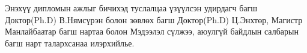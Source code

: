 
\begin{acknowledgements}
\addchaptertocentry{\acknowledgementname}

Энэхүү дипломын ажлыг бичихэд туслалцаа үзүүлсэн удирдагч багш \\
Доктор(Ph.D) В.Нямсүрэн болон зөвлөх багш Доктор(Ph.D) Ц.Энхтөр, Магистр Манлайбаатар багш нартаа болон Мэдээлэл сүлжээ, аюулгүй байдлын салбарын багш нарт талархсанаа илэрхийлье. 


\end{acknowledgements}

